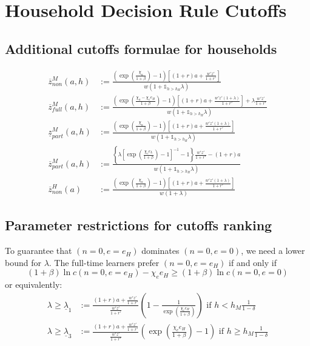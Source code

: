 \documentclass[12pt,english]{article}
\newcommand{\mathbbm}{\mathds}
\numberwithin{equation}{section}
\begin{document}
{
\fontsize{10}{11.5}\selectfont
\section{Household Decision Rule Cutoffs}
\subsection{Additional cutoffs formulae for households}
\label{app:cutoff_formulae}
\begin{align}
    \overline{z}^M_{non}(a,h)&:=\frac{(\exp(\frac{\chi_n}{1+\beta})-1)
    [(1+r)a+\frac{w'z'}{1+r'}]}{w\left(1+\mathbbm{1}_{h > h_H}\lambda\right)}  \label{eq:z-non-M} \\
    \overline{z}^M_{full}(a,h)&:=\frac{(\exp(\frac{\chi_n-\chi_e e_H}{1
    +\beta})-1)[(1+r)a+\frac{w'z'(1+\lambda)}{1+r'}]+\lambda\frac
    {w'z'}{1+r'}}{w\left(1+\mathbbm{1}_{h > h_H}\lambda\right)} \label{eq:z-slow-M} \\
    \underline{z}^M_{part}(a,h)&:=\frac{(\exp(\frac{\chi_n}{1+\beta})
    -1)[(1+r)a+\frac{w'z'(1+\lambda)}{1+r'}]}{w\left(1+\mathbbm{1}_{h > h_H}\lambda\right)} \label
    {eq:z-fast-lower-M} \\
    \overline{z}^M_{part}(a,h)&:=\frac{\left\{\lambda\left[\exp(\frac
    {\chi_e e_L}{1+\beta})-1\right]^{-1}-1\right\}\frac{w'z'}{1+r'}-
    (1+r)a}{w\left(1+\mathbbm{1}_{h > h_H}\lambda\right)}  \label{eq:z-fast-upper_M} \\
    \overline{z}^H_{non}(a)&:=\frac{(\exp(\frac{\chi_n}{1+\beta})-1)[(1+r)a+\frac{w'z'(1+\lambda)}{1+r'}]}{w(1+\lambda)}  
\end{align}

\subsection{Parameter restrictions for cutoffs ranking}
\label{app:cutoff_ranking}
To guarantee that $(n=0,e=e_H)$ dominates $(n=0,e=0)$, we need a lower bound for $\lambda$.
The full-time learners prefer $(n=0,e=e_H)$ if and only if
\begin{equation*}
    (1+\beta)\ln c(n=0,e=e_H) - \chi_e e_H \geq (1+\beta)\ln c(n=0,e=0)
\end{equation*}
or equivalently:
\begin{align}
    \lambda \geq \underline{\lambda}_1&:=\frac{(1+r)a+\frac{w'z'}{1+r'}}{\frac{w'z'}{1+r'}}\left(1-\frac{1}{\exp(\frac{\chi_e e_H}{1+\beta})}\right) \text{ if } h<h_M\frac{1}{1-\delta} \label{app:lambda1} \\
    \lambda \geq \underline{\lambda}_3&:=\frac{(1+r)a+\frac{w'z'}{1+r'}}{\frac{w'z'}{1+r'}}\left(\exp(\frac{\chi_e e_H}{1+\beta})-1\right) \text{ if } h \geq h_M\frac{1}{1-\delta} \label{app:lambda3} 
\end{align}
    

}
\end{document}
